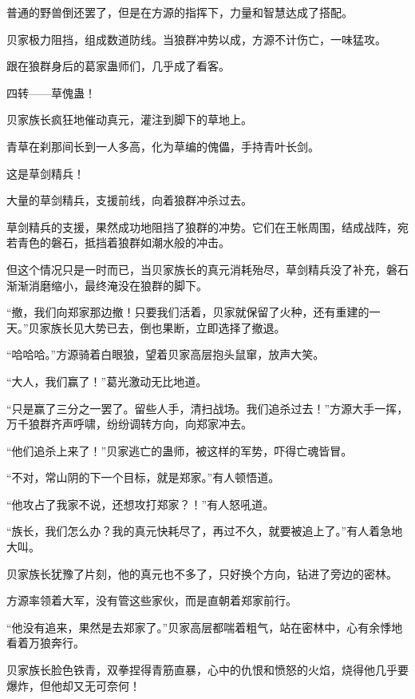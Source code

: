 \begin{this_body}
普通的野兽倒还罢了，但是在方源的指挥下，力量和智慧达成了搭配。

贝家极力阻挡，组成数道防线。当狼群冲势以成，方源不计伤亡，一味猛攻。

跟在狼群身后的葛家蛊师们，几乎成了看客。

四转——草傀蛊！

贝家族长疯狂地催动真元，灌注到脚下的草地上。

青草在刹那间长到一人多高，化为草编的傀儡，手持青叶长剑。

这是草剑精兵！

大量的草剑精兵，支援前线，向着狼群冲杀过去。

草剑精兵的支援，果然成功地阻挡了狼群的冲势。它们在王帐周围，结成战阵，宛若青色的磐石，抵挡着狼群如潮水般的冲击。

但这个情况只是一时而已，当贝家族长的真元消耗殆尽，草剑精兵没了补充，磐石渐渐消磨缩小，最终淹没在狼群的脚下。

“撤，我们向郑家那边撤！只要我们活着，贝家就保留了火种，还有重建的一天。”贝家族长见大势已去，倒也果断，立即选择了撤退。

“哈哈哈。”方源骑着白眼狼，望着贝家高层抱头鼠窜，放声大笑。

“大人，我们赢了！”葛光激动无比地道。

“只是赢了三分之一罢了。留些人手，清扫战场。我们追杀过去！”方源大手一挥，万千狼群齐声呼啸，纷纷调转方向，向郑家冲去。

“他们追杀上来了！”贝家逃亡的蛊师，被这样的军势，吓得亡魂皆冒。

“不对，常山阴的下一个目标，就是郑家。”有人顿悟道。

“他攻占了我家不说，还想攻打郑家？！”有人怒吼道。

“族长，我们怎么办？我的真元快耗尽了，再过不久，就要被追上了。”有人着急地大叫。

贝家族长犹豫了片刻，他的真元也不多了，只好换个方向，钻进了旁边的密林。

方源率领着大军，没有管这些家伙，而是直朝着郑家前行。

“他没有追来，果然是去郑家了。”贝家高层都喘着粗气，站在密林中，心有余悸地看着万狼奔行。

贝家族长脸色铁青，双拳捏得青筋直暴，心中的仇恨和愤怒的火焰，烧得他几乎要爆炸，但他却又无可奈何！

\end{this_body}

